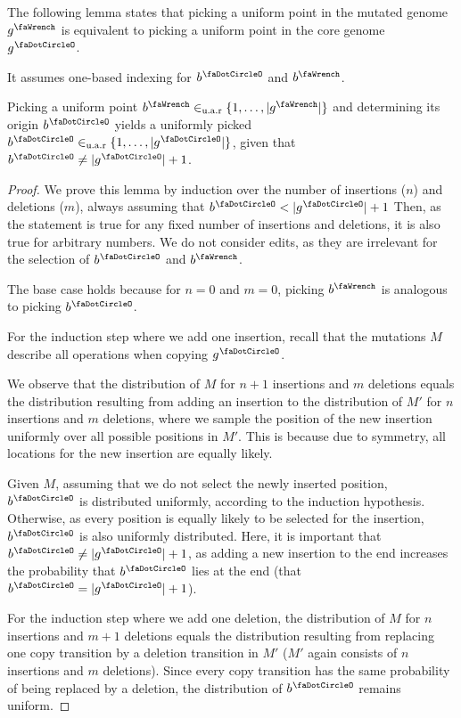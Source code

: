 The following lemma states that picking a uniform point in the mutated genome $\genome^\gmut$ is equivalent to picking a uniform point in the core genome $\genome^\gcore$.

It assumes one-based indexing for $\startInGenome^\gcore$ and $\startInGenome^\gmut$. 
\begin{lemma}[] \label{lem:uniform-position}
	Picking a uniform point $\startInGenome^\gmut \uar \{1,\dots,|\genome^\gmut|\}$ and determining its origin $\startInGenome^\gcore$ yields a uniformly picked $\startInGenome^\gcore \uar \{1,\dots,|\genome^\gcore|\}$, given that $\startInGenome^\gcore \neq |\genome^\gcore|+1$.
\end{lemma}
\begin{proof}
	We prove this lemma by induction over the number of insertions ($n$) and deletions ($m$), always assuming that $\startInGenome^\gcore < |\genome^\gcore| + 1$
	Then, as the statement is true for any fixed number of insertions and deletions, it is also true for arbitrary numbers.
	We do not consider edits, as they are irrelevant for the selection of $\startInGenome^\gcore$ and $\startInGenome^\gmut$.

	The base case holds because for $n=0$ and $m=0$, picking $\startInGenome^\gmut$ is analogous to picking $\startInGenome^\gcore$.

	For the induction step where we add one insertion, recall that the mutations $M$ describe all operations when copying $\genome^\gcore$.

	We observe that the distribution of $M$ for $n+1$ insertions and $m$ deletions equals the distribution resulting from adding an insertion to the distribution of $M'$ for $n$ insertions and $m$ deletions, where we sample the position of the new insertion uniformly over all possible positions in $M'$.
	This is because due to symmetry, all locations for the new insertion are equally likely.

	Given $M$, assuming that we do not select the newly inserted position, $\startInGenome^\gcore$ is distributed uniformly, according to the induction hypothesis.
	Otherwise, as every position is equally likely to be selected for the insertion,$\startInGenome^\gcore$ is also uniformly distributed.
	Here, it is important that $\startInGenome^\gcore \neq |\genome^\gcore|+1$, as adding a new insertion to the end increases the probability that $\startInGenome^\gcore$ lies at the end (\ie that $\startInGenome^\gcore = |\genome^\gcore|+1$).

	For the induction step where we add one deletion, the distribution of $M$ for $n$ insertions and $m+1$ deletions equals the distribution resulting from replacing one copy transition by a deletion transition in $M'$ ($M'$ again consists of $n$ insertions and $m$ deletions).
	Since every copy transition has the same probability of being replaced by a deletion, the distribution of $\startInGenome^\gcore$ remains uniform.
\end{proof}